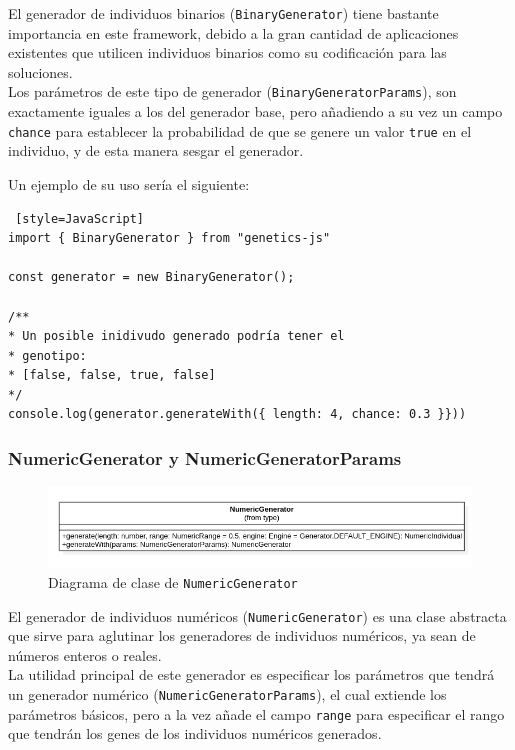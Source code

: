El generador de individuos binarios (\texttt{BinaryGenerator}) tiene bastante importancia en este framework, debido a la gran cantidad de aplicaciones existentes que utilicen individuos binarios como su codificación para las soluciones. \\

Los parámetros de este tipo de generador (\texttt{BinaryGeneratorParams}), son exactamente iguales a los del generador base, pero añadiendo a su vez un campo \texttt{chance} para establecer la probabilidad de que se genere un valor \texttt{true} en el individuo, y de esta manera sesgar el generador.

Un ejemplo de su uso sería el siguiente: \\

\begin{lstlisting} [style=JavaScript]
import { BinaryGenerator } from "genetics-js"

const generator = new BinaryGenerator();

/**
* Un posible inidivudo generado podría tener el
* genotipo:
* [false, false, true, false]
*/
console.log(generator.generateWith({ length: 4, chance: 0.3 }}))
\end{lstlisting}


\subsubsection{NumericGenerator y NumericGeneratorParams}

\begin{figure}[H]
    \centering
    \includegraphics[scale=0.5]{mem/images/cap-4/4.2.3(Generador)/NumericGenerator.png}
    \caption{Diagrama de clase de \texttt{NumericGenerator}}
    \label{fig:generator-uml}
\end{figure}

El generador de individuos numéricos (\texttt{NumericGenerator}) es una clase abstracta que sirve para aglutinar los generadores de individuos numéricos, ya sean de números enteros o reales. \\

La utilidad principal de este generador es especificar los parámetros que tendrá un generador numérico (\texttt{NumericGeneratorParams}), el cual extiende los parámetros básicos, pero a la vez añade el campo \texttt{range} para especificar el rango que tendrán los genes de los individuos numéricos generados.

